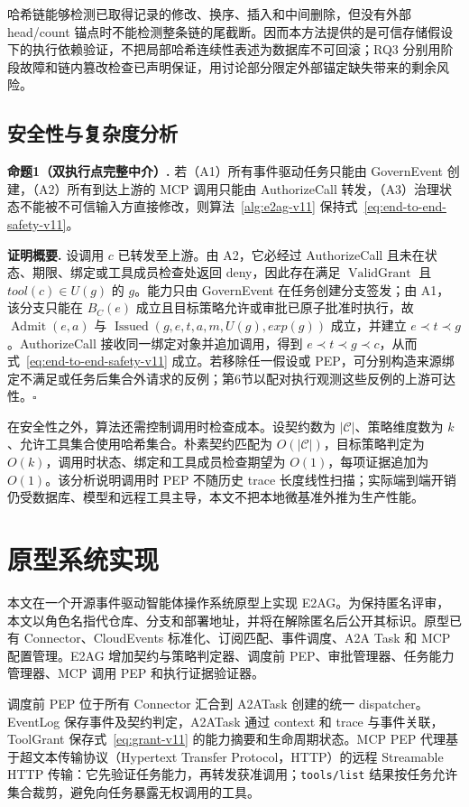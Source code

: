 哈希链能够检测已取得记录的修改、换序、插入和中间删除，但没有外部 head/count 锚点时不能检测整条链的尾截断。因而本方法提供的是可信存储假设下的执行依赖验证，不把局部哈希连续性表述为数据库不可回滚；RQ3 分别用阶段故障和链内篡改检查已声明保证，用讨论部分限定外部锚定缺失带来的剩余风险。

\subsection{安全性与复杂度分析}

\noindent\textbf{命题1（双执行点完整中介）.}
若（A1）所有事件驱动任务只能由 GovernEvent 创建，（A2）所有到达上游的 MCP 调用只能由 AuthorizeCall 转发，（A3）治理状态不能被不可信输入方直接修改，则算法~\ref{alg:e2ag-v11} 保持式~\eqref{eq:end-to-end-safety-v11}。

\noindent\textbf{证明概要.}
设调用 $c$ 已转发至上游。由 A2，它必经过 AuthorizeCall 且未在状态、期限、绑定或工具成员检查处返回 deny，因此存在满足 $\operatorname{ValidGrant}$ 且 $tool(c)\in U(g)$ 的 $g$。能力只由 GovernEvent 在任务创建分支签发；由 A1，该分支只能在 $B_C(e)$ 成立且目标策略允许或审批已原子批准时执行，故 $\operatorname{Admit}(e,a)$ 与 $\operatorname{Issued}(g,e,t,a,m,U(g),exp(g))$ 成立，并建立 $e\prec t\prec g$。AuthorizeCall 接收同一绑定对象并追加调用，得到 $e\prec t\prec g\prec c$，从而式~\eqref{eq:end-to-end-safety-v11} 成立。若移除任一假设或 PEP，可分别构造来源绑定不满足或任务后集合外请求的反例；第6节以配对执行观测这些反例的上游可达性。\hfill$\square$

在安全性之外，算法还需控制调用时检查成本。设契约数为 $|\mathcal{C}|$、策略维度数为 $k$、允许工具集合使用哈希集合。朴素契约匹配为 $O(|\mathcal{C}|)$，目标策略判定为 $O(k)$，调用时状态、绑定和工具成员检查期望为 $O(1)$，每项证据追加为 $O(1)$。该分析说明调用时 PEP 不随历史 trace 长度线性扫描；实际端到端开销仍受数据库、模型和远程工具主导，本文不把本地微基准外推为生产性能。

\section{原型系统实现}\label{sec:implementation-v11}

本文在一个开源事件驱动智能体操作系统原型上实现 E2AG。为保持匿名评审，本文以角色名指代仓库、分支和部署地址，并将在解除匿名后公开其标识。原型已有 Connector、CloudEvents 标准化、订阅匹配、事件调度、A2A Task 和 MCP 配置管理。E2AG 增加契约与策略判定器、调度前 PEP、审批管理器、任务能力管理器、MCP 调用 PEP 和执行证据验证器。

调度前 PEP 位于所有 Connector 汇合到 A2ATask 创建的统一 dispatcher。EventLog 保存事件及契约判定，A2ATask 通过 context 和 trace 与事件关联，ToolGrant 保存式~\eqref{eq:grant-v11} 的能力摘要和生命周期状态。MCP PEP 代理基于超文本传输协议（Hypertext Transfer Protocol，HTTP）的远程 Streamable HTTP 传输：它先验证任务能力，再转发获准调用；\texttt{tools/list} 结果按任务允许集合裁剪，避免向任务暴露无权调用的工具。

